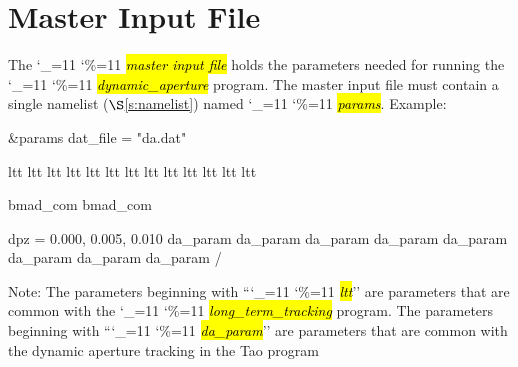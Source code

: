 \documentclass{hitec}
\newcommand\dottcmd[1]{\hl{\em#1}\endgroup}
\newcommand{\vn}{\begingroup\catcode`\_=11 \catcode`\%=11 \dottcmd}
\newcommand{\da}{\vn{dynamic_aperture}\xspace}
\newcommand{\sref}[1]{$\S$\ref{#1}}
\newcommand{\ltt}{\vn{long_term_tracking}\xspace}
\newcommand{\Section}[1]{\section{#1}\vspace*{-1ex}}
\begin{document}
\Section{Master Input File}
\label{s:input}

The \vn{master input file} holds the parameters needed for running the \da program. The master input
file must contain a single namelist (\sref{s:namelist}) named \vn{params}.  Example:
\begin{code}
&params
  dat_file = "da.dat"

  ltt%
  ltt%
  ltt%
  ltt%
  ltt%
  ltt%
  ltt%
  ltt%
  ltt%
  ltt%
  ltt%
  ltt%
  ltt%

  bmad_com%
  bmad_com%

  dpz = 0.000, 0.005, 0.010
  da_param%
  da_param%
  da_param%
  da_param%
  da_param%
  da_param%
  da_param%
  da_param%
/
\end{code}
Note: The parameters beginning with ``\vn{ltt}'' are parameters that are common with the
\ltt program. The parameters beginning with ``\vn{da_param}'' are parameters
that are common with the dynamic aperture tracking in the Tao program
\end{document}

